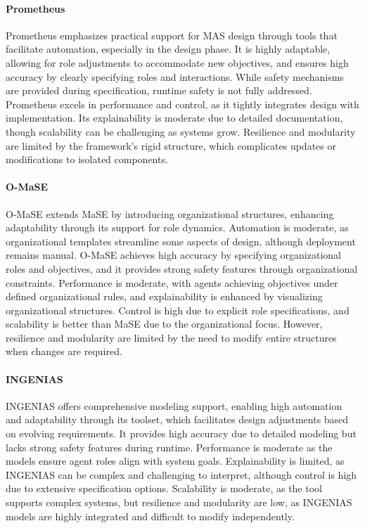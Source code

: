 \documentclass[sigconf,anonymous]{aamas}
\begin{document}
\paragraph{Prometheus}
Prometheus \cite{padgham2005prometheus} emphasizes practical support for MAS design through tools that facilitate automation, especially in the design phase. It is highly adaptable, allowing for role adjustments to accommodate new objectives, and ensures high accuracy by clearly specifying roles and interactions. While safety mechanisms are provided during specification, runtime safety is not fully addressed. Prometheus excels in performance and control, as it tightly integrates design with implementation. Its explainability is moderate due to detailed documentation, though scalability can be challenging as systems grow. Resilience and modularity are limited by the framework’s rigid structure, which complicates updates or modifications to isolated components.

\paragraph{O-MaSE}
O-MaSE \cite{garcia2007engineering} extends MaSE by introducing organizational structures, enhancing adaptability through its support for role dynamics. Automation is moderate, as organizational templates streamline some aspects of design, although deployment remains manual. O-MaSE achieves high accuracy by specifying organizational roles and objectives, and it provides strong safety features through organizational constraints. Performance is moderate, with agents achieving objectives under defined organizational rules, and explainability is enhanced by visualizing organizational structures. Control is high due to explicit role specifications, and scalability is better than MaSE due to the organizational focus. However, resilience and modularity are limited by the need to modify entire structures when changes are required.

\paragraph{INGENIAS}
INGENIAS \cite{gomez2003ingenias} offers comprehensive modeling support, enabling high automation and adaptability through its toolset, which facilitates design adjustments based on evolving requirements. It provides high accuracy due to detailed modeling but lacks strong safety features during runtime. Performance is moderate as the models ensure agent roles align with system goals. Explainability is limited, as INGENIAS can be complex and challenging to interpret, although control is high due to extensive specification options. Scalability is moderate, as the tool supports complex systems, but resilience and modularity are low, as INGENIAS models are highly integrated and difficult to modify independently.
\end{document}
